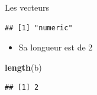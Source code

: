 \documentclass[
  ignorenonframetext,
]{beamer}
\newenvironment{Shaded}{\begin{snugshade}}{\end{snugshade}}
\newcommand{\FunctionTok}[1]{\textcolor[rgb]{0.13,0.29,0.53}{\textbf{#1}}}
\newcommand{\NormalTok}[1]{#1}
\providecommand{\tightlist}{%
  \setlength{\itemsep}{0pt}\setlength{\parskip}{0pt}}
\begin{document}
\begin{frame}[fragile]{Les vecteurs}
\begin{verbatim}
## [1] "numeric"
\end{verbatim}

\normalsize

\begin{itemize}
\tightlist
\item
  Sa longueur est de 2
\end{itemize}

\tiny

\begin{Shaded}
\begin{Highlighting}[]
\FunctionTok{length}\NormalTok{(b)}
\end{Highlighting}
\end{Shaded}

\begin{verbatim}
## [1] 2
\end{verbatim}

\normalsize
\end{frame}
\end{document}
